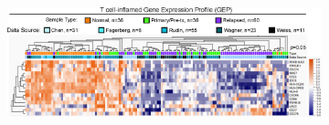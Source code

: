 \begin{figure}[htb]
    \centering
    \begin{subfigure}{0.84\textwidth}
        \includegraphics[width=\linewidth,keepaspectratio]{images/sclc/tis_genes_heatmap_sclc}
        \caption{}\label{fig:sclc:tis_genes_heatmap_sclc}
    \end{subfigure}
    

\end{figure}
